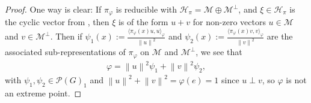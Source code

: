 \documentclass[10pt,twoside,openany,final]{memoir}
\theoremstyle{definition}
\theoremstyle{Break}
\newcommand{\lv}{\left\lVert}
\newcommand{\rv}{\right\rVert}
\renewcommand{\H}{\mathcal{H}}
\begin{document}
\begin{proof}
	One way is clear: If $\pi_\varphi$ is reducible with $\H_\pi=\mathcal{M}\oplus \mathcal{M}^\perp$, and $\xi \in \H_\pi$ is the cyclic vector from , then $\xi$ is of the form $u+v$ for non-zero vectors $u \in \mathcal{M}$ and $v \in \mathcal{M}^\perp$. Then if $\psi_1(x):=\frac{\langle \pi_\varphi(x) u,u\rangle_\varphi}{\lv u\rv^2}$ and $\psi_2(x) := \frac{ \langle \pi_\varphi (x) v,v\rangle_\varphi}{\lv v \rv^2}$ are the associated sub-representations of $\pi_\varphi$ on $\mathcal{M}$ and $\mathcal{M}^\perp$, we see that 
	\begin{align*}
		\varphi=\lv u \rv^2 \psi_1+\lv v\rv^2 \psi_2,
	\end{align*}
	with  $\psi_1,\psi_2\in \mathcal{P}(G)_1$ and $\lv u \rv^2+ \lv v \rv^2 = \varphi(e)=1$ since $u \perp v$, so $\varphi $ is not an extreme point.


\end{proof}
\end{document}
